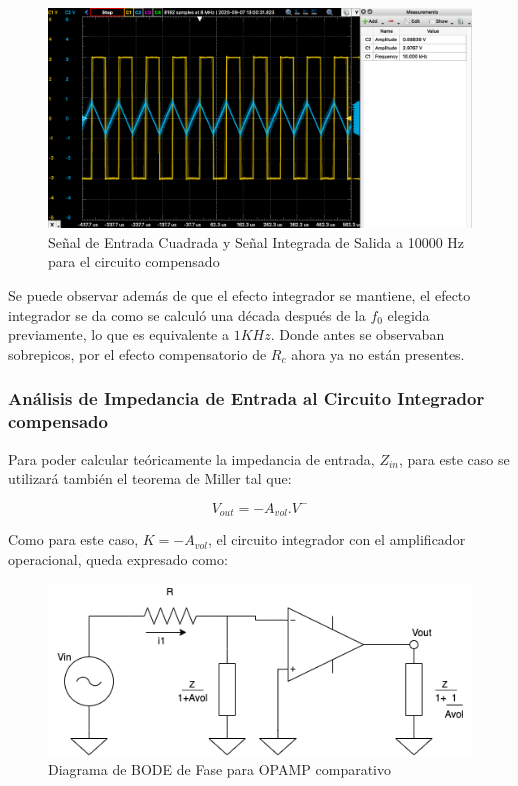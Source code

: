 \begin{figure}[H]
    \centering 
    \includegraphics [scale=0.45] {../Ejercicio3-CircuitoIntegradoresyDerivadores/Imagenes/cuadrada-compensado -10000.png} 
    \caption{Señal de Entrada Cuadrada y Señal Integrada de Salida a 10000 Hz para el circuito compensado }
    \label{fig:emptyPlotTool}
\end{figure}

Se puede observar además de que el efecto integrador se mantiene, el efecto integrador se da como se calculó una década después de la $f_0$ elegida previamente, lo que es equivalente
a $1KHz$. Donde antes se observaban sobrepicos, por el efecto compensatorio de $R_c$ ahora ya no están presentes.

\subsubsection{Análisis de Impedancia de Entrada al Circuito Integrador compensado}

Para poder calcular teóricamente la impedancia de entrada, $Z_{in}$, para este caso se utilizará también el teorema de Miller tal que:

$$ V_{out}=-A_{vol}.V^-$$

Como para este caso, $K=-A_{vol}$, el circuito integrador con el amplificador operacional, queda expresado como:

\begin{figure}[H]
    \centering 
    \includegraphics [scale=0.7] {../Ejercicio3-CircuitoIntegradoresyDerivadores/Imagenes/miller-integrador-compensado.png} 
    \caption{Diagrama de BODE de Fase para OPAMP comparativo }
    \label{fig:emptyPlotTool}
\end{figure}

